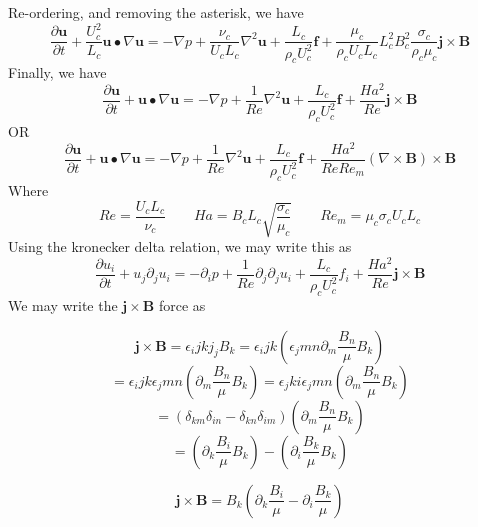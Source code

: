\documentclass[11pt]{article}
\newcommand{\B}{\mathbf{B}}
\newcommand{\U}{\mathbf{u}}
\newcommand{\PD}{\partial}
\newcommand{\J}{\mathbf{j}}
\newcommand{\F}{\mathbf{f}}
\begin{document}
Re-ordering, and removing the asterisk, we have
\begin{equation}
	\frac{\PD \U}{\PD t} + \frac{U_c^2}{L_c} \U \bullet \nabla \U = 
	- \nabla  p + 
	\frac{\nu_c}{U_c L_c} {\nabla}^2 \U + \frac{L_c}{\rho_c U_c^2} \F + 
	\frac{\mu_c}{\rho_c U_c L_c} 
	L_c^2 B_c^2 \frac{\sigma_c}{\rho_c \mu_c}
	\J \times \B
\end{equation}
Finally, we have
\begin{equation}
	\boxed{
	\frac{\PD \U}{\PD t} + \U \bullet \nabla \U = 
	-\nabla  p + 
	\frac{1}{Re} {\nabla}^2 \U + \frac{L_c}{\rho_c U_c^2} \F + 
	\frac{Ha^2}{Re} \J \times \B
	}
\end{equation}
OR
\begin{equation}
	\boxed{
	\frac{\PD \U}{\PD t} + \U \bullet \nabla \U = 
	-\nabla  p + 
	\frac{1}{Re} {\nabla}^2 \U + \frac{L_c}{\rho_c U_c^2} \F + 
	\frac{Ha^2}{Re Re_m} (\nabla \times \B) \times \B
	}
\end{equation}
Where
\begin{equation}
	Re = \frac{U_c L_c}{\nu_c} \qquad
	Ha = B_c L_c \sqrt{\frac{\sigma_c}{\mu_c}} \qquad
	Re_m = \mu_c \sigma_c U_c L_c
\end{equation}
	Using the kronecker delta relation, we may write this as
\begin{equation}
	\frac{\PD u_i }{\PD t} + u_j \PD_j u_i = 
	-\PD_i  p + 
	\frac{1}{Re} \PD_j \PD_j u_i + 
	\frac{L_c}{\rho_c U_c^2} f_i +
	\frac{Ha^2}{Re} \J \times \B
\end{equation}
We may write the $\J\times \B$ force as

\begin{equation}
	\J\times \B = \epsilon_ijk j_j B_k = 
	\epsilon_ijk \left( \epsilon_jmn \PD_m \frac{B_n}{\mu} B_k \right)
\end{equation}
\begin{equation}
	= \epsilon_ijk \epsilon_jmn \left( \PD_m \frac{B_n}{\mu} B_k \right)
	= \epsilon_jki \epsilon_jmn \left( \PD_m \frac{B_n}{\mu} B_k \right)
\end{equation}
\begin{equation}
	= (\delta_{km} \delta_{in} - \delta_{kn} \delta_{im} ) \left( \PD_m \frac{B_n}{\mu} B_k \right)
\end{equation}
\begin{equation}
	= \left( \PD_k \frac{B_i}{\mu} B_k \right) - 
	\left( \PD_i \frac{B_k}{\mu} B_k \right)
\end{equation}

\begin{equation}
	\J \times \B = B_k 
	\left( \PD_k \frac{B_i}{\mu} - \PD_i \frac{B_k}{\mu} \right)
\end{equation}
\end{document}
